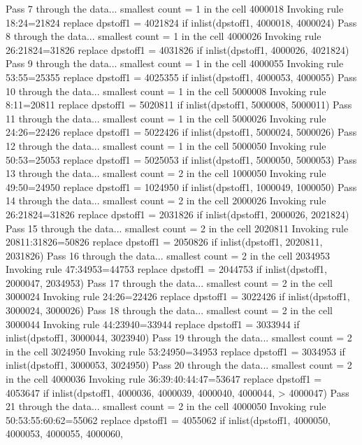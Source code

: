 Pass 7 through the data...
  smallest count = 1 in the cell      4000018
  Invoking rule 18:24=21824
  replace dpstoff1 = 4021824 if inlist(dpstoff1, 4000018, 4000024)
Pass 8 through the data...
  smallest count = 1 in the cell      4000026
  Invoking rule 26:21824=31826
  replace dpstoff1 = 4031826 if inlist(dpstoff1, 4000026, 4021824)
Pass 9 through the data...
  smallest count = 1 in the cell      4000055
  Invoking rule 53:55=25355
  replace dpstoff1 = 4025355 if inlist(dpstoff1, 4000053, 4000055)
Pass 10 through the data...
  smallest count = 1 in the cell      5000008
  Invoking rule 8:11=20811
  replace dpstoff1 = 5020811 if inlist(dpstoff1, 5000008, 5000011)
Pass 11 through the data...
  smallest count = 1 in the cell      5000026
  Invoking rule 24:26=22426
  replace dpstoff1 = 5022426 if inlist(dpstoff1, 5000024, 5000026)
Pass 12 through the data...
  smallest count = 1 in the cell      5000050
  Invoking rule 50:53=25053
  replace dpstoff1 = 5025053 if inlist(dpstoff1, 5000050, 5000053)
Pass 13 through the data...
  smallest count = 2 in the cell      1000050
  Invoking rule 49:50=24950
  replace dpstoff1 = 1024950 if inlist(dpstoff1, 1000049, 1000050)
Pass 14 through the data...
  smallest count = 2 in the cell      2000026
  Invoking rule 26:21824=31826
  replace dpstoff1 = 2031826 if inlist(dpstoff1, 2000026, 2021824)
Pass 15 through the data...
  smallest count = 2 in the cell      2020811
  Invoking rule 20811:31826=50826
  replace dpstoff1 = 2050826 if inlist(dpstoff1, 2020811, 2031826)
Pass 16 through the data...
  smallest count = 2 in the cell      2034953
  Invoking rule 47:34953=44753
  replace dpstoff1 = 2044753 if inlist(dpstoff1, 2000047, 2034953)
Pass 17 through the data...
  smallest count = 2 in the cell      3000024
  Invoking rule 24:26=22426
  replace dpstoff1 = 3022426 if inlist(dpstoff1, 3000024, 3000026)
Pass 18 through the data...
  smallest count = 2 in the cell      3000044
  Invoking rule 44:23940=33944
  replace dpstoff1 = 3033944 if inlist(dpstoff1, 3000044, 3023940)
Pass 19 through the data...
  smallest count = 2 in the cell      3024950
  Invoking rule 53:24950=34953
  replace dpstoff1 = 3034953 if inlist(dpstoff1, 3000053, 3024950)
Pass 20 through the data...
  smallest count = 2 in the cell      4000036
  Invoking rule 36:39:40:44:47=53647
  replace dpstoff1 = 4053647 if inlist(dpstoff1, 4000036, 4000039, 4000040, 4000044,
>  4000047)
Pass 21 through the data...
  smallest count = 2 in the cell      4000050
  Invoking rule 50:53:55:60:62=55062
  replace dpstoff1 = 4055062 if inlist(dpstoff1, 4000050, 4000053, 4000055, 4000060,
